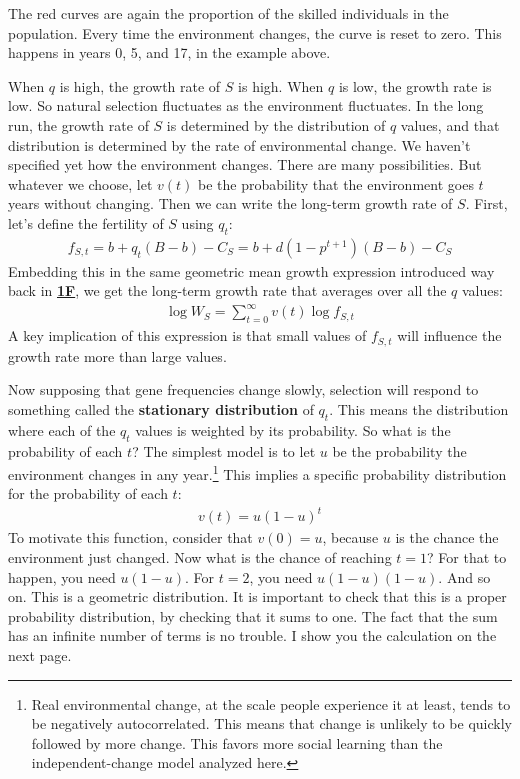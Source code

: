 \documentclass[10pt,reqno]{amsbook}
\newcommand{\bemph}[1]{{\textbf{\textcolor{bemphcol}{#1}}}}
\numberwithin{equation}{chapter}
\newcommand{\noi}{\noindent}
\begin{document}
\noi The red curves are again the proportion of the skilled individuals in the population. Every time the environment changes, the curve is reset to zero. This happens in years 0, 5, and 17, in the example above. 

When $q$ is high, the growth rate of $S$ is high. When $q$ is low, the growth rate is low. So natural selection fluctuates as the environment fluctuates. In the long run, the growth rate of $S$ is determined by the distribution of $q$ values, and that distribution is determined by the rate of environmental change. We haven't specified yet how the environment changes. There are many possibilities. But whatever we choose, let $v(t)$ be the probability that the environment goes $t$ years without changing. Then we can write the long-term growth rate of $S$. First, let's define the fertility of $S$ using $q_t$:
\begin{align*}
	f_{S,t} = b+q_t(B-b) - C_S = b + d (1-p^{t+1})(B-b)  - C_S
\end{align*}
Embedding this in the same geometric mean growth expression introduced way back in  \hyperref[link1F]{\bemph{1F}}, we get the long-term growth rate that averages over all the $q$ values:
\begin{align}
	\log W_S = \sum_{t=0}^\infty v(t) \log f_{S,t} \label{eqRogersParadoxGrowthRate}
\end{align}
A key implication of this expression is that small values of $f_{S,t}$ will influence the growth rate more than large values. 



Now supposing that gene frequencies change slowly, selection will respond to something called the \bemph{stationary distribution} of $q_t$. This means the distribution where each of the $q_t$ values is weighted by its probability. So what is the probability of each $t$? The simplest model is to let $u$ be the probability the environment changes in any year.\footnote{Real environmental change, at the scale people experience it at least, tends to be negatively autocorrelated. This means that change is unlikely to be quickly followed by more change. This favors more social learning than the independent-change model analyzed here.} This implies a specific probability distribution for the probability of each $t$:
\begin{align*}
	v(t) = u(1-u)^t
\end{align*}
To motivate this function, consider that $v(0)=u$, because $u$ is the chance the environment just changed. Now what is the chance of reaching $t=1$? For that to happen, you need $u(1-u)$. For $t=2$, you need $u(1-u)(1-u)$. And so on. 
This is a geometric distribution. It is important to check that this is a proper probability distribution, by checking that it sums to one. The fact that the sum has an infinite number of terms is no trouble. I show you the calculation on the next page. 
\end{document}
